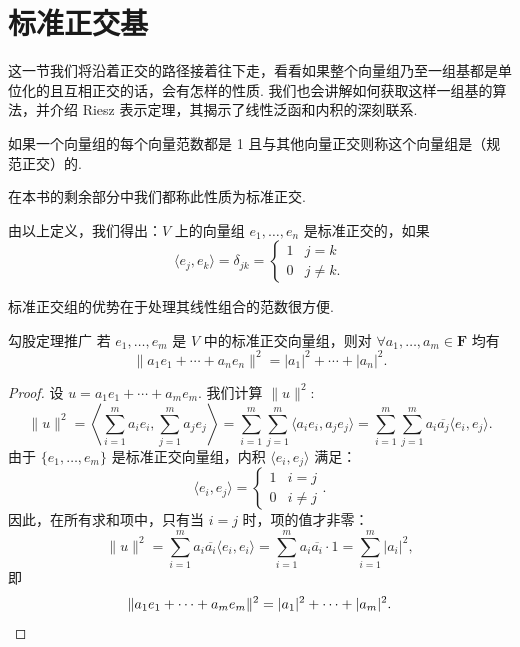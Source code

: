 \section{标准正交基}

这一节我们将沿着正交的路径接着往下走，看看如果整个向量组乃至一组基都是单位化的且互相正交的话，会有怎样的性质. 我们也会讲解如何获取这样一组基的算法，并介绍 Riesz 表示定理，其揭示了线性泛函和内积的深刻联系.

\begin{definition}{}{}
    如果一个向量组的每个向量范数都是 1 且与其他向量正交则称这个向量组是（规范正交）的.
\end{definition}

在本书的剩余部分中我们都称此性质为标准正交.

由以上定义，我们得出：$ V $ 上的向量组 $ e_1, \ldots , e_n $ 是标准正交的，如果
\[ \langle e_j, e_k \rangle = \delta _{jk} = \begin{cases}
        1 & j = k    \\
        0 & j \neq k.
    \end{cases} \]

标准正交组的优势在于处理其线性组合的范数很方便.

\begin{theorem}{}{勾股定理推广}
    若 $e_1, \ldots , e_m$ 是 $ V $ 中的标准正交向量组，则对 $\forall a_1, \ldots, a_m \in \mathbf{F}$ 均有
    \[ \lVert a_1e_1 + \cdots + a_ne_n\rVert^2 = \lvert a_1 \rvert^2 + \cdots + \lvert a_n \rvert^2.\]
\end{theorem}

\begin{proof}
    设 $u = a_1e_1 + \cdots + a_m e_m$. 我们计算 $\lVert u \rVert^2$:
    \[
        \lVert u \rVert^2 = \left\langle \sum_{i=1}^{m} a_i e_i, \sum_{j=1}^{m} a_j e_j \right\rangle = \sum_{i=1}^{m} \sum_{j=1}^{m} \langle a_i e_i, a_j e_j \rangle = \sum_{i=1}^{m} \sum_{j=1}^{m} a_i \overline{a_j} \langle e_i, e_j \rangle.
    \]
    由于 $\{e_1, \ldots, e_m\}$ 是标准正交向量组，内积 $\langle e_i, e_j \rangle$ 满足：
    \[
        \langle e_i, e_j \rangle = \begin{cases} 1 & i = j \\ 0 & i \ne j \end{cases}.
    \]
    因此，在所有求和项中，只有当 $i = j$ 时，项的值才非零：
    \[
        \lVert u \rVert^2 = \sum_{i=1}^{m} a_i \overline{a_i} \langle e_i, e_i \rangle = \sum_{i=1}^{m} a_i \overline{a_i} \cdot 1 = \sum_{i=1}^{m} \lvert a_i \rvert^2,
    \]
    即
    \[ \lVert a_1e_1 + \cdots + a_m e_m\rVert^2 = \lvert a_1 \rvert^2 + \cdots + \lvert a_m \rvert^2. \qedhere \]
\end{proof}

